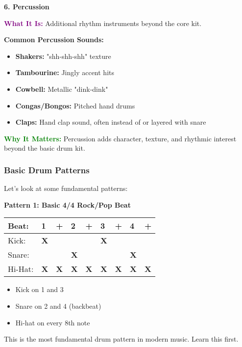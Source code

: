 \documentclass[11pt,letterpaper]{article}
\newcommand{\purple}[1]{\textcolor{purple}{\textbf{#1}}}
\newcommand{\greentext}[1]{\textcolor{green}{\textbf{#1}}}
\begin{document}
\textbf{6. Percussion}

\textbf{\purple{What It Is:}} Additional rhythm instruments beyond the core kit.

\textbf{Common Percussion Sounds:}
\begin{itemize}[leftmargin=*]
\item \textbf{Shakers:} "shh-shh-shh" texture
\item \textbf{Tambourine:} Jingly accent hits
\item \textbf{Cowbell:} Metallic "dink-dink"
\item \textbf{Congas/Bongos:} Pitched hand drums
\item \textbf{Claps:} Hand clap sound, often instead of or layered with snare
\end{itemize}

\textbf{\greentext{Why It Matters:}} Percussion adds character, texture, and rhythmic interest beyond the basic drum kit.

\subsubsection{Basic Drum Patterns}

Let's look at some fundamental patterns:

\vspace{0.5cm}

\textbf{Pattern 1: Basic 4/4 Rock/Pop Beat}

\begin{center}
\begin{tabular}{l l l l l l l l l}
Beat: & 1 & + & 2 & + & 3 & + & 4 & + \\
\hline
Kick: & \textbf{X} & & & & \textbf{X} & & & \\
Snare: & & & \textbf{X} & & & & \textbf{X} & \\
Hi-Hat: & \textbf{X} & \textbf{X} & \textbf{X} & \textbf{X} & \textbf{X} & \textbf{X} & \textbf{X} & \textbf{X} \\
\end{tabular}
\end{center}

\begin{itemize}[leftmargin=*]
\item Kick on 1 and 3
\item Snare on 2 and 4 (backbeat)
\item Hi-hat on every 8th note
\end{itemize}

This is the most fundamental drum pattern in modern music. Learn this first.
\end{document}
